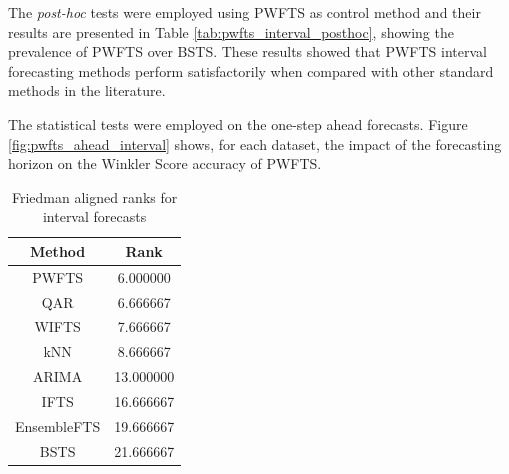 The \textit{post-hoc} tests were employed using PWFTS as control method and their results are presented in Table \ref{tab:pwfts_interval_posthoc}, showing the prevalence of PWFTS over BSTS. These results showed that PWFTS interval forecasting methods perform satisfactorily when compared with other standard methods in the literature. 

The statistical tests were employed on the one-step ahead forecasts. Figure \ref{fig:pwfts_ahead_interval} shows, for each dataset, the impact of the forecasting horizon on the Winkler Score accuracy of PWFTS.


\begin{table}[htb]
    \caption{Average Winkler Score with $\alpha=.05$ for one step ahead interval forecasts}
    \label{tab:pwfts_interval_results}
\end{table}

\begin{table}[hbt]
    \centering
    \begin{tabular}{|c|c|}
\hline
       \textbf{Method} & \textbf{Rank} \\
\hline
PWFTS &   6.000000 \\
QAR &   6.666667 \\
WIFTS &   7.666667 \\
kNN &   8.666667 \\
ARIMA &  13.000000 \\
IFTS &  16.666667 \\
EnsembleFTS &  19.666667 \\
BSTS &  21.666667 \\
\hline
\end{tabular}
    \caption{Friedman aligned ranks for interval forecasts }
    \label{tab:pwfts_interval_ranks}
\end{table}

